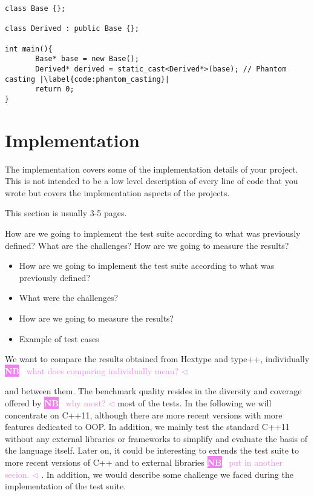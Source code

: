 \documentclass[a4paper,11pt,oneside]{report}
\newcommand{\todobox}[3]{%
       \colorbox{#1}{\textcolor{white}{\sffamily\bfseries\scriptsize #2}}%
       ~\textcolor{#1}{#3} %
       \textcolor{#1}{$\triangleleft$}%
}
\newcommand{\nb}[1]{\todobox{violet}{NB}{#1}}
\begin{document}
\begin{listing}
       \begin{verbatim}
class Base {};

class Derived : public Base {};

int main(){
       Base* base = new Base();
       Derived* derived = static_cast<Derived*>(base); // Phantom casting |\label{code:phantom_casting}|
       return 0;
} 
       \end{verbatim}
       \caption{Phantom casting example}
       \label{lst:phantom_casting}

\end{listing}

\chapter{Implementation}

The implementation covers some of the implementation details of your project.
This is not intended to be a low level description of every line of code that
you wrote but covers the implementation aspects of the projects.

This section is usually 3-5 pages.

How are we going to implement the test suite according to what was previously defined? What are the challenges? 
How are we going to measure the results?

\begin{itemize}
       \item How are we going to implement the test suite according to what was previously defined? 
       \item What were the challenges?
       \item How are we going to measure the results?
       \item Example of test cases
\end{itemize}

We want to compare the results obtained from Hextype and type++, individually \nb{what does comparing individually mean?}
and between them. The benchmark quality resides in the diversity and coverage
offered by\nb{why most?} most of the tests. In the following we will concentrate on C++11,
although there are more recent versions with more features dedicated to OOP. In
addition, we mainly test the standard C++11 without any external libraries or
frameworks to simplify and evaluate the basis of the language itself. Later on,
it could be interesting to extends the test suite to more recent versions of C++
and to external libraries\nb{put in another secion.}.  In addition, we would describe some challenge we
faced during the implementation of the test suite.
\end{document}
